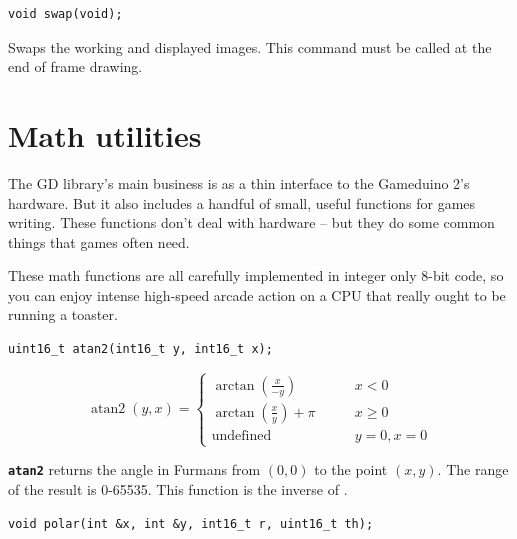 \documentclass[10pt]{book}
\newcommand{\mach}[1]{\texttt{\textbf{#1}}}
\begin{document}
\begin{CJK}{UTF8}{gkai}

\begin{framed}
\begin{verbatim}
void swap(void);
\end{verbatim}
\end{framed}

Swaps the working and displayed images.
This command must be called at the end of frame drawing.

\chapter{Math utilities}

The GD library's main business is as a thin
interface to the Gameduino 2's hardware.
But it also includes a handful of small, useful functions for games writing.
These functions don't deal with hardware -- but they do some common
things that games often need.

These math functions are all carefully implemented in integer only 
8-bit code, so you can enjoy intense high-speed arcade action on a CPU that really
ought to be running a toaster.


\begin{framed}
\begin{verbatim}
uint16_t atan2(int16_t y, int16_t x);
\end{verbatim}
\end{framed}

\[
\operatorname{atan2}(y, x) = \begin{cases}
\arctan\left(\frac x {-y} \right) & \qquad x < 0 \\
\arctan\left(\frac x y \right) + \pi& \qquad x \ge 0 \\
\text{undefined} & \qquad y = 0, x = 0
\end{cases}
\]

\mach{atan2} returns the angle in Furmans from $(0,0)$ to the point $(x, y)$.
The range of the result is 0-65535.
This function is the inverse of .
\newpage


\begin{framed}
\begin{verbatim}
void polar(int &x, int &y, int16_t r, uint16_t th);
\end{verbatim}
\end{framed}


\end{CJK}
\end{document}
